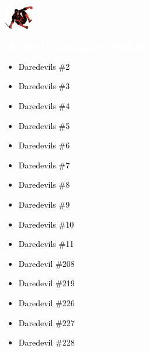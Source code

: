 \documentclass[12pt]{article}
\newcommand{\checkbox}{\raisebox{0.0ex}{\fbox{\rule{0ex}{1.5ex} \rule{1.5ex}{0ex}}}}
\begin{document}
\begin{center}
    \vspace*{2cm}
    \includegraphics[width=0.1\textwidth]{daredevil1.png}
    \vspace{0.3cm}

    {\Huge \textbf{\textcolor{white}{Daredevil Chronological Checklist}}}
\end{center}

\vspace{0.3cm}
\noindent
\begin{tcolorbox}[
  colback=white!95!gray,
  colframe=black,
  width=\textwidth,
  arc=4mm,
  auto outer arc,
  boxrule=0.8pt,
  left=8pt,right=8pt,top=8pt,bottom=8pt
]
\begin{itemize}[left=0pt,label={\checkbox}]
    \item \textcolor{black}{Daredevils \#2}
    \item \textcolor{black}{Daredevils \#3}
    \item \textcolor{black}{Daredevils \#4}
    \item \textcolor{black}{Daredevils \#5}
    \item \textcolor{black}{Daredevils \#6}
    \item \textcolor{black}{Daredevils \#7}
    \item \textcolor{black}{Daredevils \#8}
    \item \textcolor{black}{Daredevils \#9}
    \item \textcolor{black}{Daredevils \#10}
    \item \textcolor{black}{Daredevils \#11}
    \item \textcolor{black}{Daredevil \#208}
    \item \textcolor{black}{Daredevil \#219}
    \item \textcolor{black}{Daredevil \#226}
    \item \textcolor{black}{Daredevil \#227}
    \item \textcolor{black}{Daredevil \#228}
\end{itemize}
\end{tcolorbox}
\end{document}
